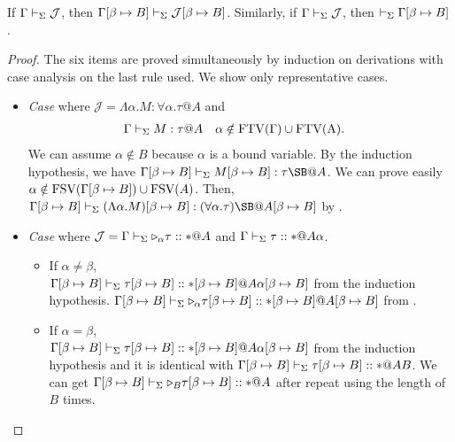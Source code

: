 
\begin{lemma}
	If $\Gamma \vdash_\Sigma \mathcal{J}$, then $\Gamma[\beta\mapsto B] \vdash_\Sigma \mathcal{J}[\beta\mapsto B]$.  Similarly, if $\Gamma \vdash_\Sigma \mathcal{J}$, then $\vdash_\Sigma \Gamma[\beta\mapsto B]$.
\end{lemma}

\begin{proof}
	The six items are proved simultaneously by induction on derivations with case analysis on the last rule used.
	We show only representative cases.
	\begin{itemize}
								
		\newcommand{\SB}{[\beta \mapsto B]}
		\newcommand{\GG}{\G\SB}
		\newcommand{\GGV}{\G\SB \V}
				
		\item \textit{Case} \TGen{} where $\mathcal{J} = \Lambda\alpha.M:\forall\alpha.\tau@A$ and
		      \begin{align*}
		      	  & \G\V M:\tau@A &   & \alpha\notin\rm{FTV}(\G)\cup\rm{FTV}(A). 
		      \end{align*}
		      We can assume $\alpha \notin B$ because $\alpha$ is a bound variable.
		      By the induction hypothesis, we have \(\G\SB\V M\SB:\tau\SB@A\).
		      We can prove easily $\alpha \notin \FTV(\GG) \cup \FTV(A)$.
		      Then, \(\GGV (\Lambda\alpha.M)\SB:(\forall\alpha.\tau)\SB@A\SB\) by \TGen.
		      		      
		\item \textit{Case} \KTW{} where \(\mathcal{J} = \Gamma\vdash_\Sigma {\mathop{\triangleright}}_\alpha \tau :: * @ A \) and \( \Gamma\vdash_\Sigma \tau :: * @ A\alpha \).
		      \begin{itemize}
		      	\item If $\alpha \neq \beta$,\\
		      	      \( \GGV \tau\SB :: *\SB @ A\alpha\SB \) from the induction hypothesis.
		      	      \( \GGV \TW_\alpha \tau\SB :: *\SB @ A\SB \) from \KTW.
		      	      	      	      	      	      	      	      	      	      	     	      
		      	\item If $\alpha = \beta$, \\
		      	      \( \GGV \tau\SB :: *\SB @ A\alpha\SB \) from the induction hypothesis and
		      	      it is identical with \( \GGV \tau\SB :: * @ AB \).
		      	      We can get \( \GGV \TW_B \tau\SB :: * @ A \) after repeat using \KTW the length of $B$ times.
		      	      

\end{itemize}
\end{itemize}
\end{proof}
